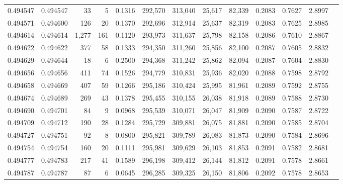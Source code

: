 \begin{tabular}{rrrrrrrrrrrrr}
0.494547 & 0.494547 &    33 &     5 &                                     0.1316 & 292,570 & 313,040 &  25,617 &  82,339 & 0.2083 & 0.7627 & 2.8997 \\
0.494571 & 0.494600 &   126 &    20 &                                     0.1370 & 292,696 & 312,914 &  25,637 &  82,319 & 0.2083 & 0.7625 & 2.8985 \\
0.494614 & 0.494614 & 1,277 &   161 &                                     0.1120 & 293,973 & 311,637 &  25,798 &  82,158 & 0.2086 & 0.7610 & 2.8867 \\
0.494622 & 0.494622 &   377 &    58 &                                     0.1333 & 294,350 & 311,260 &  25,856 &  82,100 & 0.2087 & 0.7605 & 2.8832 \\
0.494629 & 0.494644 &    18 &     6 &                                     0.2500 & 294,368 & 311,242 &  25,862 &  82,094 & 0.2087 & 0.7604 & 2.8830 \\
0.494656 & 0.494656 &   411 &    74 &                                     0.1526 & 294,779 & 310,831 &  25,936 &  82,020 & 0.2088 & 0.7598 & 2.8792 \\
0.494658 & 0.494669 &   407 &    59 &                                     0.1266 & 295,186 & 310,424 &  25,995 &  81,961 & 0.2089 & 0.7592 & 2.8755 \\
0.494674 & 0.494689 &   269 &    43 &                                     0.1378 & 295,455 & 310,155 &  26,038 &  81,918 & 0.2089 & 0.7588 & 2.8730 \\
0.494690 & 0.494701 &    84 &     9 &                                     0.0968 & 295,539 & 310,071 &  26,047 &  81,909 & 0.2090 & 0.7587 & 2.8722 \\
0.494709 & 0.494712 &   190 &    28 &                                     0.1284 & 295,729 & 309,881 &  26,075 &  81,881 & 0.2090 & 0.7585 & 2.8704 \\
0.494727 & 0.494751 &    92 &     8 &                                     0.0800 & 295,821 & 309,789 &  26,083 &  81,873 & 0.2090 & 0.7584 & 2.8696 \\
0.494754 & 0.494754 &   160 &    20 &                                     0.1111 & 295,981 & 309,629 &  26,103 &  81,853 & 0.2091 & 0.7582 & 2.8681 \\
0.494777 & 0.494783 &   217 &    41 &                                     0.1589 & 296,198 & 309,412 &  26,144 &  81,812 & 0.2091 & 0.7578 & 2.8661 \\
0.494787 & 0.494787 &    87 &     6 &                                     0.0645 & 296,285 & 309,325 &  26,150 &  81,806 & 0.2092 & 0.7578 & 2.8653 \\

\end{tabular}
